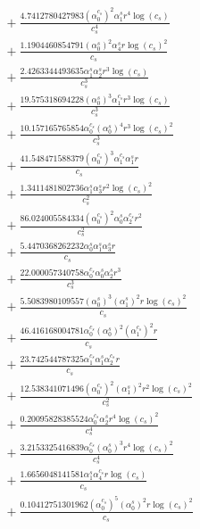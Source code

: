 \documentclass[10pt]{article}
\begin{document}
\begin{align*}
&{}  + \frac{4.7412780427983 \left(\alpha_{0}^{c_s}\right)^{2} \alpha_{1}^s r^{4} \log{\left(c_{s} \right)}}{c_{s}^{4}} \\
&{}  + \frac{1.1904460854791 \left(\alpha_{0}^s\right)^{2} \alpha_{4}^s r \log{\left(c_{s} \right)}^{2}}{c_{s}} \\
&{}  + \frac{2.4263344493635 \alpha_{1}^s \alpha_{2}^s r^{3} \log{\left(c_{s} \right)}}{c_{s}^{3}} \\
&{}  + \frac{19.575318694228 \left(\alpha_{0}^s\right)^{3} \alpha_{1}^{c_s} r^{3} \log{\left(c_{s} \right)}}{c_{s}^{3}} \\
&{}  + \frac{10.157165765854 \alpha_{0}^{c_s} \left(\alpha_{0}^s\right)^{4} r^{3} \log{\left(c_{s} \right)}^{2}}{c_{s}^{3}} \\
&{}  + \frac{41.548471588379 \left(\alpha_{0}^{c_s}\right)^{3} \alpha_{1}^{c_s} \alpha_{1}^s r}{c_{s}} \\
&{}  + \frac{1.3411481802736 \alpha_{1}^s \alpha_{3}^s r^{2} \log{\left(c_{s} \right)}^{2}}{c_{s}^{2}} \\
&{}  + \frac{86.024005584334 \left(\alpha_{0}^{c_s}\right)^{2} \alpha_{0}^s \alpha_{2}^{c_s} r^{2}}{c_{s}^{2}} \\
&{}  + \frac{5.4470368262232 \alpha_{0}^s \alpha_{1}^s \alpha_{3}^s r}{c_{s}} \\
&{}  + \frac{22.000057340758 \alpha_{0}^{c_s} \alpha_{0}^s \alpha_{2}^s r^{3}}{c_{s}^{3}} \\
&{}  + \frac{5.5083980109557 \left(\alpha_{0}^s\right)^{3} \left(\alpha_{1}^s\right)^{2} r \log{\left(c_{s} \right)}^{2}}{c_{s}} \\
&{}  + \frac{46.416168004781 \alpha_{0}^{c_s} \left(\alpha_{0}^s\right)^{2} \left(\alpha_{1}^{c_s}\right)^{2} r}{c_{s}} \\
&{}  + \frac{23.742544787325 \alpha_{1}^{c_s} \alpha_{1}^s \alpha_{2}^{c_s} r}{c_{s}} \\
&{}  + \frac{12.538341071496 \left(\alpha_{0}^{c_s}\right)^{2} \left(\alpha_{1}^s\right)^{2} r^{2} \log{\left(c_{s} \right)}^{2}}{c_{s}^{2}} \\
&{}  + \frac{0.20095828385524 \alpha_{0}^{c_s} \alpha_{2}^s r^{4} \log{\left(c_{s} \right)}^{2}}{c_{s}^{4}} \\
&{}  + \frac{3.2153325416839 \alpha_{0}^{c_s} \left(\alpha_{0}^s\right)^{3} r^{4} \log{\left(c_{s} \right)}^{2}}{c_{s}^{4}} \\
&{}  + \frac{1.6656048141581 \alpha_{1}^s \alpha_{4}^{c_s} r \log{\left(c_{s} \right)}}{c_{s}} \\
&{}  + \frac{0.10412751301962 \left(\alpha_{0}^{c_s}\right)^{5} \left(\alpha_{0}^s\right)^{2} r \log{\left(c_{s} \right)}^{2}}{c_{s}} \\

\end{align*}
\end{document}
